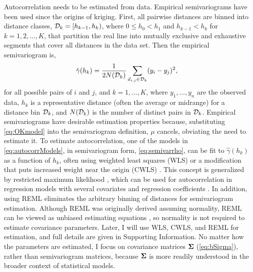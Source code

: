 \documentclass[11pt, titlepage]{article}\usepackage[]{graphicx}\usepackage[]{color}
\begin{document}
\begin{spacing}{1.9}
\begin{flushleft}
Autocorrelation needs to be estimated from data. Empirical semivariograms have been used since the origins of kriging. First, all pairwise distances are binned into distance classes, $\mathcal{D}_k = [h_{k-1},h_k)$, where $0 \le h_0 < h_1$ and $h_{k-1} < h_k$ for $k = 1, 2, \ldots, K$, that partition the real line into mutually exclusive and exhaustive segments that cover all distances in the data set.  Then the empirical semivariogram is,
\begin{equation} \label{eq:gammahat}
				\hat{\gamma}(h_k) = \frac{1}{2N(\mathcal{D}_k)}\sum_{d_{i,j} \in \mathcal{D}_k} (y_i - y_j)^2,
\end{equation}
for all possible pairs of $i$ and $j$, and $k = 1, \ldots, K$, where $y_1, . . . ,y_n$ are the observed data, $h_k$ is a representative distance (often the average or midrange) for a distance bin $\mathcal{D}_k$, and $N(\mathcal{D}_k)$ is the number of distinct pairs in $\mathcal{D}_k$. Empirical semivariograms have desirable estimation properties \citep[it is an unbiased estimator,][p. 71]{Cres:stat:1993} because, substituting \ref{eq:OKmodel} into the semivariogram definition, $\mu$ cancels, obviating the need to estimate it.  To estimate autocorrelation, one of the models in \ref{eq:autocorrModels}, in semivariogram form, \ref{eq:semivarrho}, can be fit to $\hat{\gamma}(h_k)$ as a function of $h_k$, often using weighted least squares (WLS) or a modification that puts increased weight near the origin (CWLS) \citep{Cres:fitt:1985}.  This concept is generalized by restricted maximum likelihood \citep[REML, ][]{Patt:Thom:reco:1971, Patt:Thom:maxi:1974}, which can be used for autocorrelation in regression models with several covariates and regression coefficients \citep[for REML applied to spatial models, see, e.g.,][p. 93]{Cres:stat:1993}. In addition, using REML eliminates the arbitrary binning of distances for semivariogram estimation.  Although REML was originally derived assuming normality, REML can be viewed as unbiased estimating equations \citep{Heyd:quas:1994, Cres:Lahi:asym:1996}, so normality is not required to estimate covariance parameters.  Later, I will use WLS, CWLS, and REML for estimation, and full details are given in Supporting Information. No matter how the parameters are estimated, I focus on covariance matrices $\mbox{\boldmath $\Sigma$}$ (\ref{eq:bSigma}), rather than semivariogram matrices, because $\mbox{\boldmath $\Sigma$}$ is more readily understood in the broader context of statistical models.


\end{flushleft}
\end{spacing}
\end{document}
